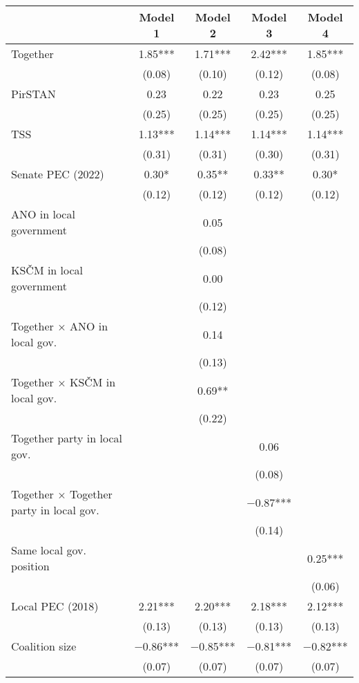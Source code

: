 \begin{table}
\centering
\begin{tabular}[t]{lcccc}
\toprule
  & Model 1 & Model 2 & Model 3 & Model 4\\
\midrule
Together & \num{1.85}*** & \num{1.71}*** & \num{2.42}*** & \num{1.85}***\\
 & (\num{0.08}) & (\num{0.10}) & (\num{0.12}) & (\num{0.08})\\
PirSTAN & \num{0.23} & \num{0.22} & \num{0.23} & \num{0.25}\\
 & (\num{0.25}) & (\num{0.25}) & (\num{0.25}) & (\num{0.25})\\
TSS & \num{1.13}*** & \num{1.14}*** & \num{1.14}*** & \num{1.14}***\\
 & (\num{0.31}) & (\num{0.31}) & (\num{0.30}) & (\num{0.31})\\
Senate PEC (2022) & \num{0.30}* & \num{0.35}** & \num{0.33}** & \num{0.30}*\\
 & (\num{0.12}) & (\num{0.12}) & (\num{0.12}) & (\num{0.12})\\
ANO in local government &  & \num{0.05} &  & \\
 &  & (\num{0.08}) &  & \\
KSČM in local government &  & \num{0.00} &  & \\
 &  & (\num{0.12}) &  & \\
Together × ANO in local gov. &  & \num{0.14} &  & \\
 &  & (\num{0.13}) &  & \\
Together × KSČM in local gov. &  & \num{0.69}** &  & \\
 &  & (\num{0.22}) &  & \\
Together party in local gov. &  &  & \num{0.06} & \\
 &  &  & (\num{0.08}) & \\
Together × Together party in local gov. &  &  & \num{-0.87}*** & \\
 &  &  & (\num{0.14}) & \\
Same local gov. position &  &  &  & \num{0.25}***\\
 &  &  &  & (\num{0.06})\\
Local PEC (2018) & \num{2.21}*** & \num{2.20}*** & \num{2.18}*** & \num{2.12}***\\
 & (\num{0.13}) & (\num{0.13}) & (\num{0.13}) & (\num{0.13})\\
Coalition size & \num{-0.86}*** & \num{-0.85}*** & \num{-0.81}*** & \num{-0.82}***\\
 & (\num{0.07}) & (\num{0.07}) & (\num{0.07}) & (\num{0.07})\\

\end{tabular}
\end{table}
